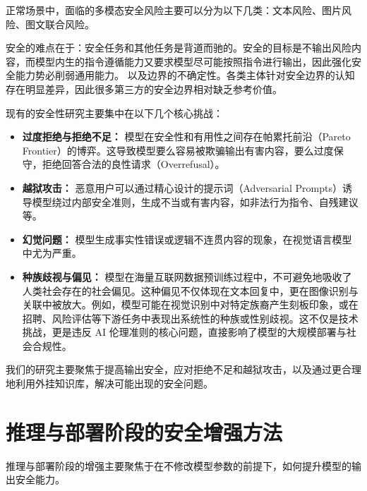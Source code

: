 正常场景中，面临的多模态安全风险主要可以分为以下几类：文本风险、图片风险、图文联合风险。

安全的难点在于：安全任务和其他任务是背道而驰的。安全的目标是不输出风险内容，而模型内生的指令遵循能力又要求模型尽可能按照指令进行输出，因此强化安全能力势必削弱通用能力。
以及边界的不确定性。各类主体针对安全边界的认知存在明显差异，因此很多第三方的安全边界相对缺乏参考价值。

现有的安全性研究主要集中在以下几个核心挑战：

\begin{itemize}
    \item \textbf{过度拒绝与拒绝不足：} 模型在安全性和有用性之间存在帕累托前沿（Pareto Frontier）的博弈。这导致模型要么容易被欺骗输出有害内容，要么过度保守，拒绝回答合法的良性请求（Overrefusal）。
    
    \item \textbf{越狱攻击：} 恶意用户可以通过精心设计的提示词（Adversarial Prompts）诱导模型绕过内部安全准则，生成不当或有害内容，如非法行为指令、自残建议等\supercite{DBLP:conf/iclr/AndriushchenkoC25, Robey2023SmoothLLMDL}。
    
    \item \textbf{幻觉问题：} 模型生成事实性错误或逻辑不连贯内容的现象\supercite{DBLP:journals/csur/JiLFYSXIBMF23,DBLP:conf/emnlp/LiCZNW23}，在视觉语言模型中尤为严重。
    
    \item \textbf{种族歧视与偏见：} 模型在海量互联网数据预训练过程中，不可避免地吸收了人类社会存在的社会偏见\supercite{DBLP:conf/acl/ParrishCNPPTHB22,DBLP:conf/acl/BlodgettBDW20}。这种偏见不仅体现在文本回复中，更在图像识别与关联中被放大。例如，模型可能在视觉识别中对特定族裔产生刻板印象\supercite{DBLP:conf/fat/BenderGMS21}，或在招聘、风险评估等下游任务中表现出系统性的种族或性别歧视。这不仅是技术挑战，更是违反 AI 伦理准则的核心问题，直接影响了模型的大规模部署与社会合规性。
\end{itemize}

我们的研究主要聚焦于提高输出安全，应对拒绝不足和越狱攻击，以及通过更合理地利用外挂知识库，解决可能出现的安全问题。

\section{推理与部署阶段的安全增强方法}
推理与部署阶段的增强主要聚焦于在不修改模型参数的前提下，如何提升模型的输出安全能力。
